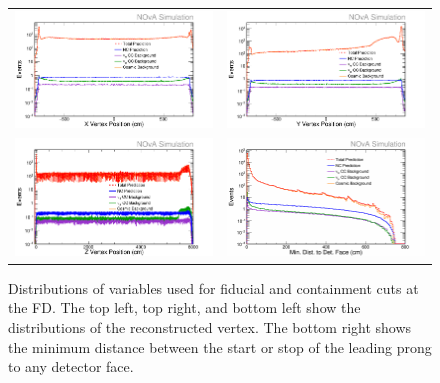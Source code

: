 \begin{figure}[h]
  \centering
  \begin{tabular}{c c}
    \includegraphics[width=.48\textwidth]{figures/NP1VtxX.png} &
    \includegraphics[width=.48\textwidth]{figures/NP1VtxY.png} \\
    \includegraphics[width=.48\textwidth]{figures/NP1VtxZ.png} &
    \includegraphics[width=.48\textwidth]{figures/NP1Cont.png} \\
  \end{tabular}
  \caption[Fiducial and Containment Variable Distributions]{Distributions of variables used for fiducial and containment cuts at the FD. The top left, top right, and bottom left show the distributions of the reconstructed vertex. The bottom right shows the minimum distance between the start or stop of the leading prong to any detector face.}
  \label{fig:FidCont}
\end{figure}

